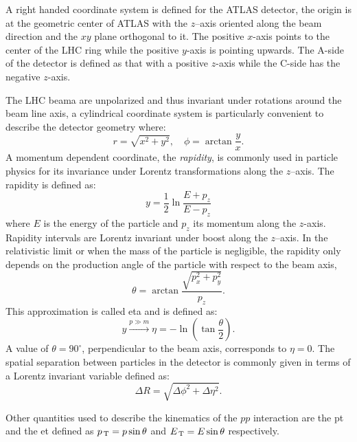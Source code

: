 A right handed coordinate system is defined for the ATLAS detector, the origin
is at the geometric center of ATLAS with the $z$--axis oriented along the beam
direction and the $xy$ plane orthogonal to it. The positive $x$-axis points to
the center of the LHC ring while the positive $y$-axis is pointing upwards. The
A-side of the detector is defined as that with a positive $z$-axis while the
C-side has the negative $z$-axis.

The LHC beama are unpolarized and thus invariant under rotations around the beam
line axis, a cylindrical coordinate system is particularly convenient to
describe the detector geometry where:
\begin{equation}
  \label{eq:57}
  r = \sqrt{x^2 + y^2}, \quad \phi = \arctan \frac{y}{x}.
\end{equation}
A momentum dependent coordinate, the \emph{rapidity}, is commonly used in
particle physics for its invariance under Lorentz transformations along the
$z$--axis. The rapidity is defined as:
\begin{equation}
  \label{eq:58}
  y = \frac{1}{2} \ln \frac{E + p_z}{E - p_z}
\end{equation}
where $E$ is the energy of the particle and $p_z$ its momentum along the
$z$-axis. Rapidity intervals are Lorentz invariant under boost along the
$z$--axis. In the relativistic limit or when the mass of the particle is
negligible, the rapidity only depends on the production angle of the particle
with respect to the beam axis,
\begin{equation}
  \label{eq:59}
  \theta = \arctan \frac{\sqrt{p_x^2 + p_y^2}}{p_z}.
\end{equation}
This approximation is called \gls{eta} and is defined as:
\begin{equation}
  \label{eq:60}
  y \xrightarrow{p \gg m} \eta = - \ln \left( \tan \frac{\theta}{2} \right).
\end{equation}
A value of $\theta = 90^{\circ}$, perpendicular to the beam axis, corresponds to
$\eta = 0$. The spatial separation between particles in the detector is commonly
given in terms of a Lorentz invariant variable defined as:
\begin{equation}
  \label{eq:61}
  \Delta R = \sqrt{\Delta \phi^2 + \Delta \eta^2}.
\end{equation}

Other quantities used to describe the kinematics of the $pp$ interaction are the
\gls{pt} and the \gls{et} defined as $p_\mathrm{\, T} = p \sin \theta$ and
$E_\mathrm{\, T} = E \sin \theta$ respectively.
